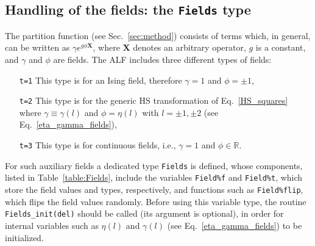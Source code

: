 \subsection{Handling of the fields: the \texttt{Fields} type} \label{sec:fields}

The partition function (see Sec.~\ref{sec:method}) consists of terms which, in general, can be written as $\gamma e^{g \phi \bm{X} }$, where $\bm{X}$ denotes an arbitrary operator, $g$ is a constant, and $\gamma$ and $\phi$ are fields. 
The ALF includes three different types of fields:
\begin{itemize}
\item[\texttt{t=1}]   This type is for an  Ising field, therefore $\gamma= 1$ and $ \phi = \pm 1$,
\item[\texttt{t=2}]   This type is for the generic HS  transformation of Eq.~\ref{HS_squares} where  $\gamma \equiv \gamma(l) $  and $ \phi = \eta(l)$  with $l = \pm 1, \pm 2$ (see Eq.~\ref{eta_gamma_fields}),
\item[\texttt{t=3}]   This type is for continuous fields, i.e., $\gamma= 1$  and $ \phi  \in \mathbb{R}$.
\end{itemize}

For such auxiliary fields a dedicated type \texttt{Fields} is defined, whose components, listed in Table~\ref{table:Fields}, include the variables \texttt{Field\%f} and \texttt{Field\%t}, which store the field values and types, respectively, and functions such as \texttt{Field\%flip}, which flips the field values randomly. Before using this variable type, the routine \texttt{Fields\_init(del)} should be called (its argument is optional), in order for internal variables such as  $\eta(l)$ and $\gamma(l)$  (see Eq.~\ref{eta_gamma_fields}) to be initialized.


